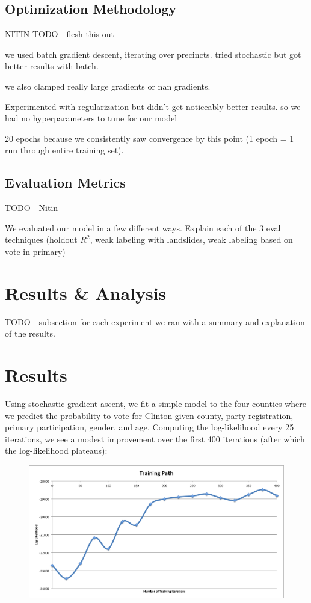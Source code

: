 \documentclass[10pt, letterpaper]{article}
\begin{document}
\subsection{Optimization Methodology}

NITIN TODO - flesh this out

we used batch gradient descent, iterating over precincts. tried stochastic but got better results with batch.

we also clamped really large gradients or nan gradients.

Experimented with regularization but didn't get noticeably better results. so we had no hyperparameters to tune for our model

20 epochs because we consistently saw convergence by this point (1 epoch = 1 run through entire training set).

\subsection{Evaluation Metrics}

TODO - Nitin

We evaluated our model in a few different ways. Explain each of the 3 eval techniques (holdout $R^2$, weak labeling with landslides, weak labeling based on vote in primary)

\section{Results \& Analysis}

TODO - subsection for each experiment we ran with a summary and explanation of the results.



\section{Results}

Using stochastic gradient ascent, we fit a simple model to the four counties where we predict the probability to vote for Clinton given county, party registration, primary participation, gender, and age. Computing the log-likelihood every 25 iterations, we see a modest improvement over the first 400 iterations (after which the log-likelihood plateaus): 
\begin{figure}[H]
\centering
\includegraphics[scale = 0.4]{TrainingPath}
\end{figure}
\end{document}
